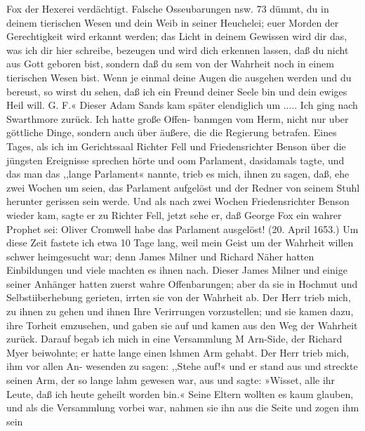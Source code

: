 Fox der Hexerei verdächtigt. Falsche Osseubarungen nsw. 73
dümmt, du in deinem tierischen Wesen und dein Weib in seiner
Heuchelei; euer Morden der Gerechtigkeit wird erkannt werden;
das Licht in deinem Gewissen wird dir das, was ich dir hier
schreibe, bezeugen und wird dich erkennen lassen, daß du nicht
aus Gott geboren bist, sondern daß du sem von der Wahrheit
noch in einem tierischen Wesen bist. Wenn je einmal deine Augen
die ausgehen werden und du bereust, so wirst du sehen, daß ich
ein Freund deiner Seele bin und dein ewiges Heil will.
G. F.«
Dieser Adam Sands kam später elendiglich um .....
Ich ging nach Swarthmore zurück. Ich hatte große Offen-
banmgen vom Herm, nicht nur uber göttliche Dinge, sondern
auch über äußere, die die Regierung betrafen. Eines Tages,
als ich im Gerichtssaal Richter Fell und Friedensrichter Benson
über die jüngsten Ereignisse sprechen hörte und oom Parlament,
dasidamals tagte, und das man das ,,lange Parlament« nannte,
trieb es mich, ihnen zu sagen, daß, ehe zwei Wochen um seien,
das Parlament aufgelöst und der Redner von seinem Stuhl herunter
gerissen sein werde. Und als nach zwei Wochen Friedensrichter
Benson wieder kam, sagte er zu Richter Fell, jetzt sehe er, daß
George Fox ein wahrer Prophet sei: Oliver Cromwell habe das
Parlament ausgelöst! (20. April 1653.)
Um diese Zeit fastete ich etwa 10 Tage lang, weil mein
Geist um der Wahrheit willen schwer heimgesucht war; denn
James Milner und Richard Näher hatten Einbildungen und viele
machten es ihnen nach. Dieser James Milner und einige seiner
Anhänger hatten zuerst wahre Offenbarungen; aber da sie in
Hochmut und Selbstiiberhebung gerieten, irrten sie von der
Wahrheit ab. Der Herr trieb mich, zu ihnen zu gehen und ihnen
Ihre Verirrungen vorzustellen; und sie kamen dazu, ihre Torheit
emzusehen, und gaben sie auf und kamen aus den Weg der
Wahrheit zurück. Darauf begab ich mich in eine Versammlung
M Arn-Side, der Richard Myer beiwohnte; er hatte lange einen
lshmen Arm gehabt. Der Herr trieb mich, ihm vor allen An-
wesenden zu sagen: ,,Stehe auf!« und er stand aus und streckte
seinen Arm, der so lange lahm gewesen war, aus und sagte:
»Wisset, alle ihr Leute, daß ich heute geheilt worden bin.« Seine
Eltern wollten es kaum glauben, und als die Versammlung
vorbei war, nahmen sie ihn aus die Seite und zogen ihm sein


